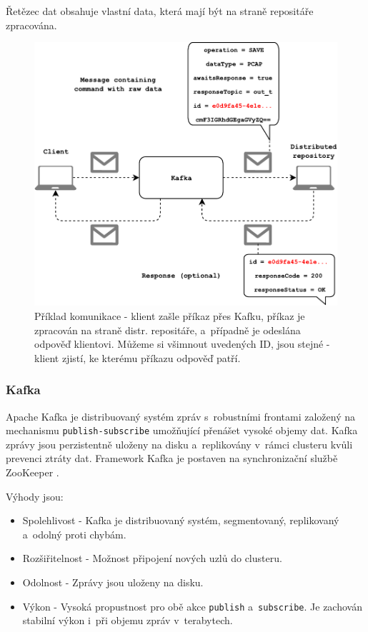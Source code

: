 \noindent Řetězec dat obsahuje vlastní data, která mají být na straně repositáře zpracována.

\begin{figure}[!h]
  \centering
  \includegraphics[width=15cm]{template-fig/Kafka_communication.pdf}
  \caption{Příklad komunikace - klient zašle příkaz přes Kafku, příkaz je zpracován na straně distr. repositáře, a~případně je odeslána odpověď klientovi. Můžeme si všimnout uvedených ID, jsou stejné - klient zjistí, ke kterému příkazu odpověď patří.}
  \label{FIG_KafkaCommunication}
\end{figure}

\subsubsection{Kafka}
Apache Kafka je distribuovaný systém zpráv s~robustními frontami založený na mechanismu \texttt{publish-subscribe} umožňující přenášet vysoké objemy dat. Kafka zprávy jsou perzistentně uloženy na disku a~replikovány v~rámci clusteru kvůli prevenci ztráty dat. Framework Kafka je postaven na synchronizační službě ZooKeeper \cite{kafkaTutorialsPoint}.

\vspace{0.5cm}
\noindent Výhody jsou:
\begin{itemize}
    \item Spolehlivost - Kafka je distribuovaný systém, segmentovaný, replikovaný a~odolný proti chybám.
    \item Rozšiřitelnost - Možnost připojení nových uzlů do clusteru.
    \item Odolnost - Zprávy jsou uloženy na disku.
    \item Výkon - Vysoká propustnost pro obě akce \texttt{publish} a~\texttt{subscribe}. Je zachován stabilní výkon i~při objemu zpráv v~terabytech.
\end{itemize}

